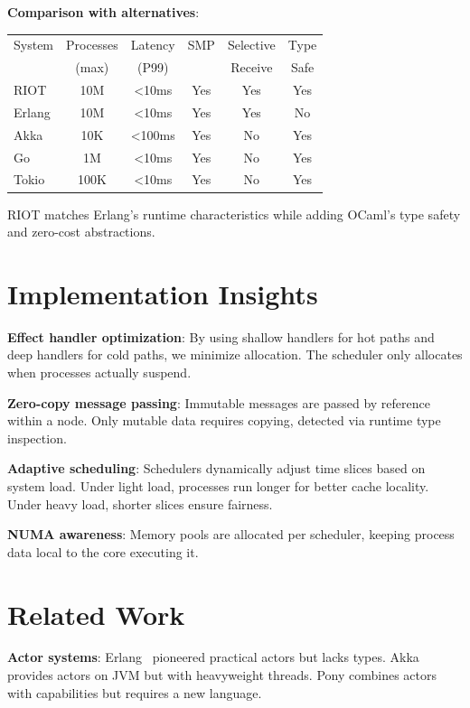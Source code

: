 \documentclass[sigplan,10pt]{acmart}
\begin{document}
\textbf{Comparison with alternatives}:

\begin{center}
\small
\begin{tabular}{lccccc}
\hline
System & Processes & Latency & SMP & Selective & Type \\
       & (max)     & (P99)   &     & Receive   & Safe \\
\hline
RIOT & 10M & <10ms & Yes & Yes & Yes \\
Erlang & 10M & <10ms & Yes & Yes & No \\
Akka & 10K & <100ms & Yes & No & Yes \\
Go & 1M & <10ms & Yes & No & Yes \\
Tokio & 100K & <10ms & Yes & No & Yes \\
\hline
\end{tabular}
\end{center}

RIOT matches Erlang's runtime characteristics while adding OCaml's type safety and zero-cost abstractions.

\vspace{-0.2cm}
\section{Implementation Insights}

\textbf{Effect handler optimization}: By using shallow handlers for hot paths and deep handlers for cold paths, we minimize allocation. The scheduler only allocates when processes actually suspend.

\textbf{Zero-copy message passing}: Immutable messages are passed by reference within a node. Only mutable data requires copying, detected via runtime type inspection.

\textbf{Adaptive scheduling}: Schedulers dynamically adjust time slices based on system load. Under light load, processes run longer for better cache locality. Under heavy load, shorter slices ensure fairness.

\textbf{NUMA awareness}: Memory pools are allocated per scheduler, keeping process data local to the core executing it.

\vspace{-0.2cm}
\section{Related Work}

\textbf{Actor systems}: Erlang~\cite{armstrong2003making} pioneered practical actors but lacks types. Akka~\cite{akka} provides actors on JVM but with heavyweight threads. Pony combines actors with capabilities but requires a new language.
\end{document}
